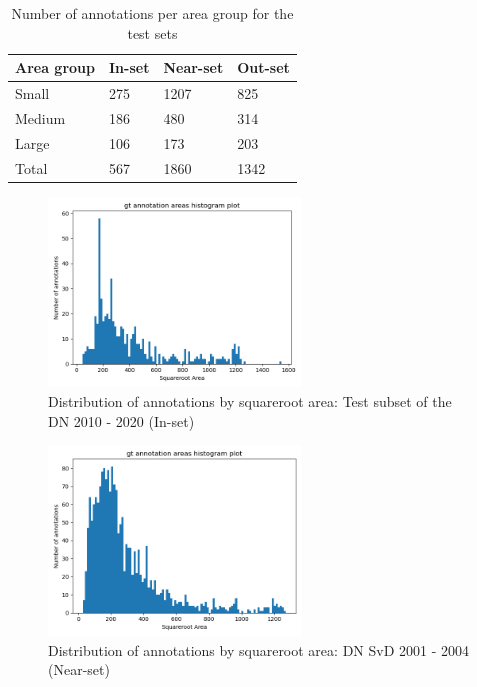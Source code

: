 \documentclass[oneside, english, bibtex]{kththesis}
\begin{document}
\begin{table}[H]
  \begin{center}
    \caption{Number of annotations per area group for the test sets}
    \label{tab:annotationspertestset}
    \begin{tabular}{l|l|l|l} %
    \textbf{Area group} & \textbf{In-set} & \textbf{Near-set} & \textbf{Out-set}  \\
    \hline
    Small & 275 & 1207 & 825  \\    \hline
    Medium & 186 & 480 & 314 \\    \hline
    Large & 106 & 173 & 203 \\    \hline
    Total & 567 & 1860 & 1342 \\    \hline
    \end{tabular}
  \end{center}
\end{table}


\begin{figure}[H]
  \begin{center}
    \includegraphics[width=0.6\textwidth]{figures/annotation-histogram-inset.png}
  \end{center}
  \caption{Distribution of annotations by squareroot area: Test subset of the DN 2010 - 2020 (In-set)}
  \label{fig:size_dist_annotations_in}
\end{figure}

\begin{figure}[H]
  \begin{center}
    \includegraphics[width=0.6\textwidth]{figures/annotation-histogram-nearset.png}
  \end{center}
  \caption{Distribution of annotations by squareroot area: DN SvD 2001 - 2004 (Near-set)}
  \label{fig:size_dist_annotations_near}
\end{figure}
\end{document}
